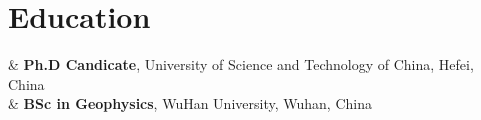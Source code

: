 \section{Education}

\begin{EntriesTable}
    &
  \textbf{Ph.D Candicate}, University of Science and Technology of China, Hefei, China
  \\
    &
  \textbf{BSc in Geophysics}, WuHan University, Wuhan, China
\end{EntriesTable}
